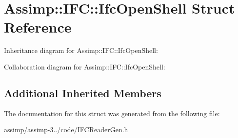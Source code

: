 \hypertarget{struct_assimp_1_1_i_f_c_1_1_ifc_open_shell}{\section{Assimp\+:\+:I\+F\+C\+:\+:Ifc\+Open\+Shell Struct Reference}
\label{struct_assimp_1_1_i_f_c_1_1_ifc_open_shell}
}


Inheritance diagram for Assimp\+:\+:I\+F\+C\+:\+:Ifc\+Open\+Shell\+:


Collaboration diagram for Assimp\+:\+:I\+F\+C\+:\+:Ifc\+Open\+Shell\+:
\subsection*{Additional Inherited Members}


The documentation for this struct was generated from the following file\+:\begin{DoxyCompactItemize}
\item 
assimp/assimp-\/3../code/I\+F\+C\+Reader\+Gen.\+h\end{DoxyCompactItemize}
